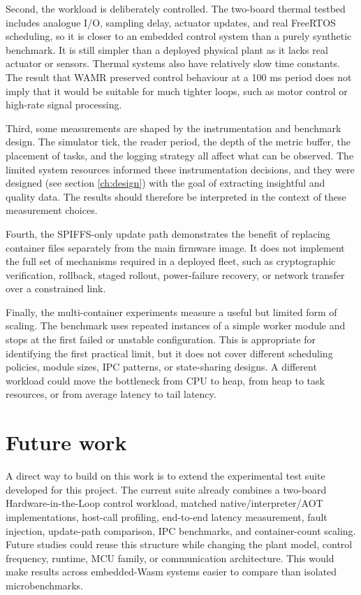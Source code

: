 \documentclass[12pt, a4paper]{report}
\begin{document}
Second, the workload is deliberately controlled. The two-board thermal testbed includes analogue I/O, sampling delay, actuator updates, and real FreeRTOS scheduling, so it is closer to an embedded control system than a purely synthetic benchmark. It is still simpler than a deployed physical plant as it lacks real actuator or sensors. Thermal systems also have relatively slow time constants. The result that WAMR preserved control behaviour at a 100 ms period does not imply that it would be suitable for much tighter loops, such as motor control or high-rate signal processing.

Third, some measurements are shaped by the instrumentation and benchmark design. The simulator tick, the reader period, the depth of the metric buffer, the placement of tasks, and the logging strategy all affect what can be observed. The limited system resources informed these instrumentation decisions, and they were designed (see section \autoref{ch:design}) with the goal of extracting insightful and quality data. The results should therefore be interpreted in the context of these measurement choices.

Fourth, the SPIFFS-only update path demonstrates the benefit of replacing container files separately from the main firmware image. It does not implement the full set of mechanisms required in a deployed fleet, such as cryptographic verification, rollback, staged rollout, power-failure recovery, or network transfer over a constrained link.

Finally, the multi-container experiments measure a useful but limited form of scaling. The benchmark uses repeated instances of a simple worker module and stops at the first failed or unstable configuration. This is appropriate for identifying the first practical limit, but it does not cover different scheduling policies, module sizes, IPC patterns, or state-sharing designs. A different workload could move the bottleneck from CPU to heap, from heap to task resources, or from average latency to tail latency.

\section{Future work}

A direct way to build on this work is to extend the experimental test suite developed for this project. The current suite already combines a two-board Hardware-in-the-Loop control workload, matched native/interpreter/AOT implementations, host-call profiling, end-to-end latency measurement, fault injection, update-path comparison, IPC benchmarks, and container-count scaling. Future studies could reuse this structure while changing the plant model, control frequency, runtime, MCU family, or communication architecture. This would make results across embedded-Wasm systems easier to compare than isolated microbenchmarks.
\end{document}
